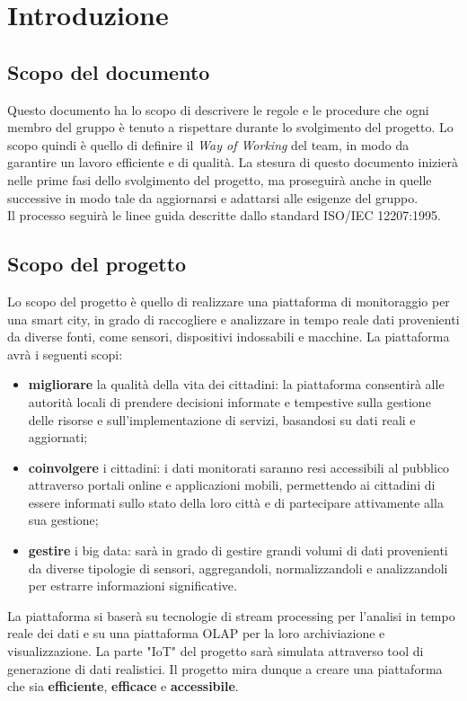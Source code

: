 \section{Introduzione}
\subsection{Scopo del documento}
Questo documento ha lo scopo di descrivere le regole e le procedure che ogni membro del gruppo è tenuto a rispettare durante lo svolgimento del progetto. Lo scopo quindi è quello di definire il \textit{Way of Working} del team, in modo da garantire un lavoro efficiente e di qualità. La stesura di questo documento inizierà nelle prime fasi dello svolgimento del progetto, ma proseguirà anche in quelle successive in modo tale da aggiornarsi e adattarsi alle esigenze del gruppo.\\ 
Il processo seguirà le linee guida descritte dallo standard ISO/IEC 12207:1995.

\subsection{Scopo del progetto}
Lo scopo del progetto è quello di realizzare una piattaforma di monitoraggio per una smart city, in grado di raccogliere e analizzare in tempo reale dati provenienti da diverse fonti, come sensori, dispositivi indossabili e macchine. La piattaforma avrà i seguenti scopi:
\begin{itemize}
    \item \textbf{migliorare} la qualità della vita dei cittadini: la piattaforma consentirà alle autorità locali di prendere decisioni informate e tempestive sulla gestione delle risorse e sull'implementazione di servizi, basandosi su dati reali e aggiornati;
    \item \textbf{coinvolgere} i cittadini: i dati monitorati saranno resi accessibili al pubblico attraverso portali online e applicazioni mobili, permettendo ai cittadini di essere informati sullo stato della loro città e di partecipare attivamente alla sua gestione;
    \item \textbf{gestire} i big data: sarà in grado di gestire grandi volumi di dati provenienti da diverse tipologie di sensori, aggregandoli, normalizzandoli e analizzandoli per estrarre informazioni significative.
\end{itemize}
La piattaforma si baserà su tecnologie di stream processing per l'analisi in tempo reale dei dati e su una piattaforma OLAP per la loro archiviazione e visualizzazione. La parte "IoT" del progetto sarà simulata attraverso tool di generazione di dati realistici.
Il progetto mira dunque a creare una piattaforma che sia \textbf{efficiente}, \textbf{efficace} e \textbf{accessibile}.

